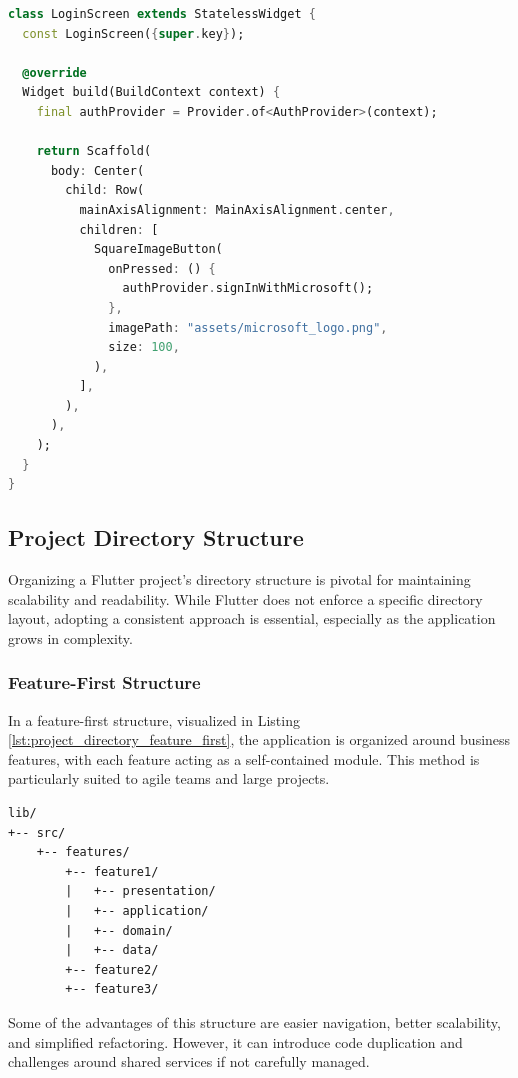 \documentclass[
  digital,     %
  oneside,     %
  nosansbold,  %
  nocolorbold, %
  lof,         %
  lot,         %
]{fithesis4}
\begin{document}
\begin{lstlisting}[language=Dart, caption={View layer example on LoginScreen Widget class}, label={lst:login_screen}, floatplacement=H, showstringspaces=false]
class LoginScreen extends StatelessWidget {
  const LoginScreen({super.key});

  @override
  Widget build(BuildContext context) {
    final authProvider = Provider.of<AuthProvider>(context);

    return Scaffold(
      body: Center(
        child: Row(
          mainAxisAlignment: MainAxisAlignment.center,
          children: [
            SquareImageButton(
              onPressed: () {
                authProvider.signInWithMicrosoft();
              },
              imagePath: "assets/microsoft_logo.png",
              size: 100,
            ),
          ],
        ),
      ),
    );
  }
}
\end{lstlisting}

\subsection{Project Directory Structure}

Organizing a Flutter project's directory structure is pivotal for maintaining scalability and readability. While Flutter does not enforce a specific directory layout, adopting a consistent approach is essential, especially as the application grows in complexity.

\subsubsection{Feature-First Structure}

In a feature-first structure, visualized in Listing \ref{lst:project_directory_feature_first}, the application is organized around business features, with each feature acting as a self-contained module.  
This method is particularly suited to agile teams and large projects.

\begin{lstlisting}[caption={Feature-first directory structure}, label={lst:project_directory_feature_first}, floatplacement=H, showstringspaces=false]
lib/
+-- src/
    +-- features/
        +-- feature1/
        |   +-- presentation/
        |   +-- application/
        |   +-- domain/
        |   +-- data/
        +-- feature2/
        +-- feature3/
\end{lstlisting}

Some of the advantages of this structure are easier navigation, better scalability, and simplified refactoring.  
However, it can introduce code duplication and challenges around shared services if not carefully managed.
\end{document}
